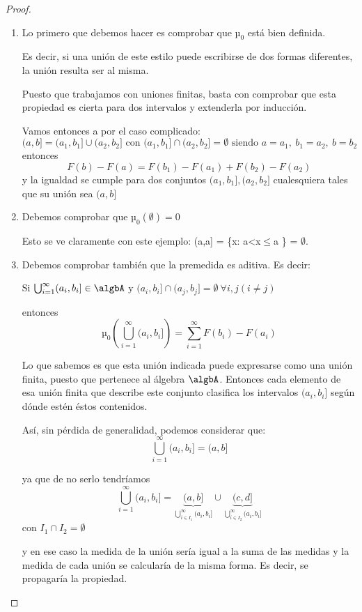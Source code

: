 \documentclass{apuntes}
\begin{document}
\begin{proof}
\begin{enumerate}
\item Lo primero que debemos hacer es comprobar que $µ_0$ está bien definida.

Es decir, si una unión de este estilo puede escribirse de dos formas diferentes, la unión resulta ser al misma.

Puesto que trabajamos con uniones finitas, basta con comprobar que esta propiedad es cierta para dos intervalos y extenderla por inducción.

Vamos entonces a por el caso complicado:
\[(a,b]=(a_1,b_1]\cup (a_2, b_2] \text{ con } (a_1,b_1]\cap (a_2, b_2] = \emptyset \text{ siendo } a=a_1, \ b_1 = a_2, \ b=b_2\]
entonces
\[F(b)-F(a)=F(b_1)-F(a_1)+F(b_2)-F(a_2)\]
y la igualdad se cumple para dos conjuntos $(a_1,b_1], (a_2, b_2]$ cualesquiera tales que su unión sea $(a,b]$

\item Debemos comprobar que $µ_0(\emptyset)=0$

Esto se ve claramente con este ejemplo: (a,a] = \{x: a<x$\leq$a \} = $\emptyset$.

\item Debemos comprobar también que la premedida es aditiva. Es decir:

Si $\bigcup_{i=1}^{\infty}(a_i, b_i] \in \algbA$ y $(a_i, b_i] \cap (a_j, b_j] = \emptyset \ \forall i,j (i\neq j)$

entonces
\[µ_0\left(\bigcup_{i=1}^{\infty}(a_i, b_i]\right)=\sum_{i=1}^{\infty} F(b_i)-F(a_i)\]

Lo que sabemos es que esta unión indicada puede expresarse como una unión finita, puesto que pertenece al álgebra $\algbA$. Entonces cada elemento de esa unión finita que describe este conjunto clasifica los intervalos $(a_i, b_i]$ según dónde estén éstos contenidos.

Así, sin pérdida de generalidad, podemos considerar que:
\[\bigcup_{i=1}^{\infty}(a_i, b_i] = (a,b]\]

ya que de no serlo tendríamos
\[\bigcup_{i=1}^{\infty}(a_i, b_i] = \underbrace{(a,b]}_{\bigcup_{i\in I_1}^{\infty}(a_i, b_i]} \cup \underbrace{(c,d]}_{\bigcup_{i\in I_2}^{\infty}(a_i, b_i]}\]
con $I_1 \cap I_2 = \emptyset$

y en ese caso la medida de la unión sería igual a la suma de las medidas y la medida de cada unión se calcularía de la misma forma. Es decir, se propagaría la propiedad.


\end{enumerate}
\end{proof}
\end{document}
